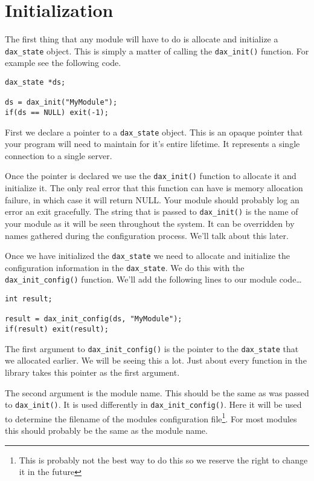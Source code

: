 \section{Initialization}

The first thing that any module will have to do is allocate and initialize a
\verb|dax_state| object.  This is simply a matter of
calling the \verb|dax_init()| function.  For example
see the following code.

\begin{verbatim}
dax_state *ds;

ds = dax_init("MyModule");
if(ds == NULL) exit(-1);
\end{verbatim}

First we declare a pointer to a \verb|dax_state| object.  This is an opaque
pointer that your program will need to maintain for it's entire lifetime.  It
represents a single connection to a single server.

Once the pointer is declared we use the \verb|dax_init()| function to allocate
it and initialize it.  The only real error that this function can have is
memory allocation failure, in which case it will return NULL.  Your module
should probably log an error an exit gracefully.  The string that is passed to
\verb|dax_init()| is the name of your module as it will be seen throughout the
system.  It can be overridden by names gathered during the configuration
process.  We'll talk about this later.

Once we have initialized the \verb|dax_state| we need to allocate and initialize
the configuration information in the \verb|dax_state|.  We do this with the
\verb|dax_init_config()| function.  We'll
add the following lines to our module code\ldots

\begin{verbatim}
int result;

result = dax_init_config(ds, "MyModule");
if(result) exit(result);
\end{verbatim}

The first argument to \verb|dax_init_config()| is the pointer to the
\verb|dax_state| that we allocated earlier.  We will be seeing this a lot.  Just
about every function in the library takes this pointer as the first argument.

The second argument is the module name.  This should be the same as was passed
to \verb|dax_init()|.  It is used differently in \verb|dax_init_config()|.  Here
it will be used to determine the filename of the modules configuration
file\footnote{This is probably not the best way to do this so we reserve the
right to change it in the future}.  For most modules this should probably be the
same as the module name.

